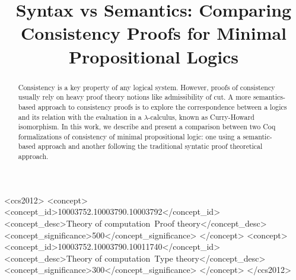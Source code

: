 \documentclass[manuscript, review, anonymous, sigconf]{acmart}
\title{Syntax vs Semantics: Comparing Consistency Proofs for Minimal
  Propositional Logics}
\theoremstyle{definition}
\begin{document}
\begin{abstract}
  Consistency is a key property of any logical system. However, proofs of
  consistency usually rely on heavy proof theory notions like admissibility
  of cut. A more semantics-based approach to consistency proofs is to explore the
  correspondence between a logics and its relation with the
  evaluation in a $\lambda$-calculus, known as Curry-Howard isomorphism.
  In this work, we describe and present a comparison between two Coq
  formalizations of consistency of minimal propositional logic: one using a
  semantic-based approach and another following the traditional syntatic proof
  theoretical approach.
\end{abstract}

\begin{CCSXML}
<ccs2012>
<concept>
<concept_id>10003752.10003790.10003792</concept_id>
<concept_desc>Theory of computation~Proof theory</concept_desc>
<concept_significance>500</concept_significance>
</concept>
<concept>
<concept_id>10003752.10003790.10011740</concept_id>
<concept_desc>Theory of computation~Type theory</concept_desc>
<concept_significance>300</concept_significance>
</concept>
</ccs2012>
\end{CCSXML}


\maketitle

\renewcommand{\shortauthors}{Sasdelli et al.}





\end{document}

